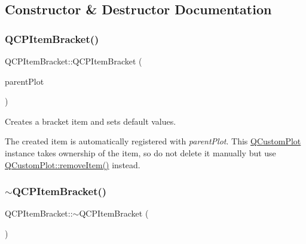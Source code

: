 \subsection{Constructor \& Destructor Documentation}
\mbox{\label{class_q_c_p_item_bracket_a44ecfa37a76de5e3549e2d61f9d8ee56}} 
\subsubsection{\texorpdfstring{Q\+C\+P\+Item\+Bracket()}{QCPItemBracket()}}
{\footnotesize\ttfamily Q\+C\+P\+Item\+Bracket\+::\+Q\+C\+P\+Item\+Bracket (\begin{DoxyParamCaption}\item[{\hyperlink{class_q_custom_plot}{Q\+Custom\+Plot} $\ast$}]{parent\+Plot }\end{DoxyParamCaption})\hspace{0.3cm}{\ttfamily [explicit]}}

Creates a bracket item and sets default values.

The created item is automatically registered with {\itshape parent\+Plot}. This \hyperlink{class_q_custom_plot}{Q\+Custom\+Plot} instance takes ownership of the item, so do not delete it manually but use \hyperlink{class_q_custom_plot_ae04446557292551e8fb6e2c106e1848d}{Q\+Custom\+Plot\+::remove\+Item()} instead. \mbox{\label{class_q_c_p_item_bracket_ad773c3e8e09868d6f8caeb92c54919f4}} 
\subsubsection{\texorpdfstring{$\sim$\+Q\+C\+P\+Item\+Bracket()}{~QCPItemBracket()}}
{\footnotesize\ttfamily Q\+C\+P\+Item\+Bracket\+::$\sim$\+Q\+C\+P\+Item\+Bracket (\begin{DoxyParamCaption}{ }\end{DoxyParamCaption})\hspace{0.3cm}{\ttfamily [virtual]}}



